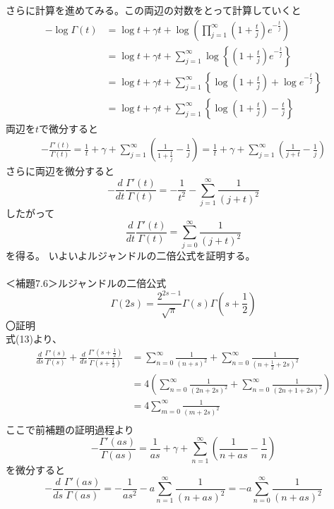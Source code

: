 \documentclass{jsarticle}
\begin{document}
さらに計算を進めてみる。この両辺の対数をとって計算していくと
\begin{align*}
-\log\Gamma(t)&=\log t+\gamma t+\log\left(\prod_{j=1}^{\infty}\left(1+\frac{t}{j}\right)e^{-\frac{t}{j}}\right)\\
&=\log t+\gamma t+\sum_{j=1}^{\infty}\log\left\{\left(1+\frac{t}{j}\right)e^{-\frac{t}{j}}\right\}\\
&=\log t+\gamma t+\sum_{j=1}^{\infty}\left\{\log\left(1+\frac{t}{j}\right)+\log e^{-\frac{t}{j}}\right\}\\
&=\log t+\gamma t+\sum_{j=1}^{\infty}\left\{\log\left(1+\frac{t}{j}\right)-\frac{t}{j}\right\}
\end{align*}
両辺を\(t\)で微分すると
\begin{align*}
-\frac{\Gamma'(t)}{\Gamma(t)}=\frac{1}{t}+\gamma+\sum_{j=1}^{\infty}\left(\frac{1}{1+\frac{t}{j}}-\frac{1}{j}\right)=\frac{1}{t}+\gamma+\sum_{j=1}^{\infty}\left(\frac{1}{j+t}-\frac{1}{j}\right)
\end{align*}
さらに両辺を微分すると
\[-\frac{d}{dt}\frac{\Gamma'(t)}{\Gamma(t)}=-\frac{1}{t^2}-\sum_{j=1}^{\infty}\frac{1}{(j+t)^2}\]
したがって
\begin{equation}
\frac{d}{dt}\frac{\Gamma'(t)}{\Gamma(t)}=\sum_{j=0}^{\infty}\frac{1}{(j+t)^{2}}
\end{equation}
を得る。
いよいよルジャンドルの二倍公式を証明する。\\
\\
＜補題7.6＞ルジャンドルの二倍公式\\
\begin{equation}
\Gamma(2s)=\frac{2^{2s-1}}{\sqrt{\pi}}\Gamma(s)\Gamma\left(s+\frac{1}{2}\right)
\end{equation}
〇証明\\
式(13)より、
\begin{align*}
\frac{d}{ds}\frac{\Gamma'(s)}{\Gamma(s)}+\frac{d}{ds}\frac{\Gamma'\left(s+\frac{1}{2}\right)}{\Gamma\left(s+\frac{1}{2}\right)}&=\sum_{n=0}^{\infty}\frac{1}{(n+s)^2}+\sum_{n=0}^{\infty}\frac{1}{\left(n+\frac{1}{2}+2s\right)^2}\\
&=4\left(\sum_{n=0}^{\infty}\frac{1}{(2n+2s)^2}+\sum_{n=0}^{\infty}\frac{1}{(2n+1+2s)^2}\right)\\
&=4\sum_{m=0}^{\infty}\frac{1}{(m+2s)^2}\\
\end{align*}
ここで前補題の証明過程より
\[-\frac{\Gamma'(as)}{\Gamma(as)}=\frac{1}{as}+\gamma+\sum_{n=1}^{\infty}\left(\frac{1}{n+as}-\frac{1}{n}\right)\]
を微分すると
\[-\frac{d}{ds}\frac{\Gamma'(as)}{\Gamma(as)}=-\frac{1}{as^2}-a\sum_{n=1}^{\infty}\frac{1}{(n+as)^2}=-a\sum_{n=0}^{\infty}\frac{1}{(n+as)^2}\]
\end{document}
